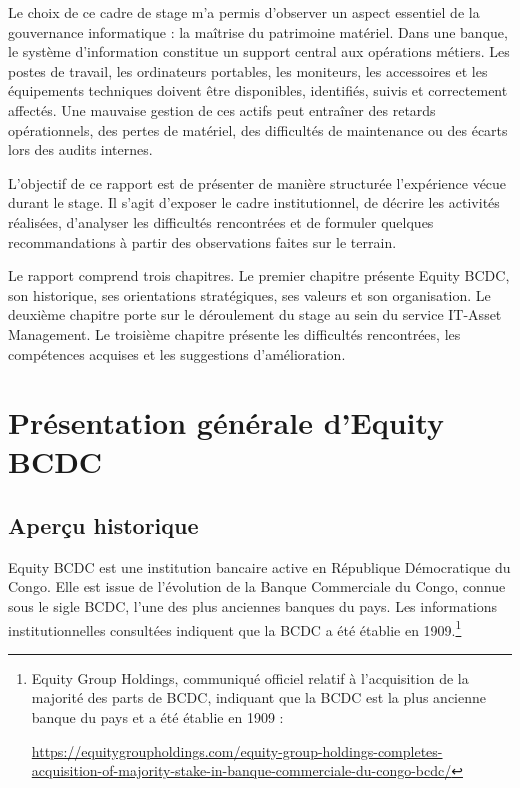 \documentclass[12pt,a4paper]{report}
\begin{document}
Le choix de ce cadre de stage m'a permis d'observer un aspect essentiel de la gouvernance informatique : la maîtrise du patrimoine matériel. Dans une banque, le système d'information constitue un support central aux opérations métiers. Les postes de travail, les ordinateurs portables, les moniteurs, les accessoires et les équipements techniques doivent être disponibles, identifiés, suivis et correctement affectés. Une mauvaise gestion de ces actifs peut entraîner des retards opérationnels, des pertes de matériel, des difficultés de maintenance ou des écarts lors des audits internes.

L'objectif de ce rapport est de présenter de manière structurée l'expérience vécue durant le stage. Il s'agit d'exposer le cadre institutionnel, de décrire les activités réalisées, d'analyser les difficultés rencontrées et de formuler quelques recommandations à partir des observations faites sur le terrain.

Le rapport comprend trois chapitres. Le premier chapitre présente Equity BCDC, son historique, ses orientations stratégiques, ses valeurs et son organisation. Le deuxième chapitre porte sur le déroulement du stage au sein du service IT-Asset Management. Le troisième chapitre présente les difficultés rencontrées, les compétences acquises et les suggestions d'amélioration.

\chapter{Présentation générale d'Equity BCDC}

\section{Aperçu historique}

Equity BCDC est une institution bancaire active en République Démocratique du Congo. Elle est issue de l'évolution de la Banque Commerciale du Congo, connue sous le sigle BCDC, l'une des plus anciennes banques du pays. Les informations institutionnelles consultées indiquent que la BCDC a été établie en 1909.\footnote{Equity Group Holdings, communiqué officiel relatif à l'acquisition de la majorité des parts de BCDC, indiquant que la BCDC est la plus ancienne banque du pays et a été établie en 1909 :\par
\url{https://equitygroupholdings.com/equity-group-holdings-completes-acquisition-of-majority-stake-in-banque-commerciale-du-congo-bcdc/}}
\end{document}

